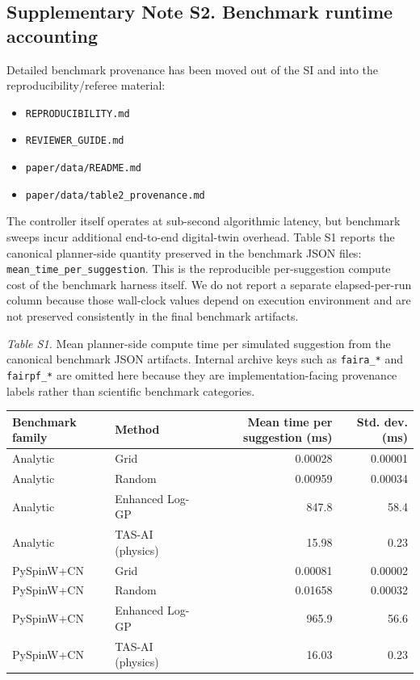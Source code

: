 \documentclass[
]{article}
\providecommand{\tightlist}{%
  \setlength{\itemsep}{0pt}\setlength{\parskip}{0pt}}
\begin{document}
\hypertarget{supplementary-note-s2.-benchmark-runtime-accounting}{%
\subsection{Supplementary Note S2. Benchmark runtime
accounting}\label{supplementary-note-s2.-benchmark-runtime-accounting}}

Detailed benchmark provenance has been moved out of the SI and into the
reproducibility/referee material:

\begin{itemize}
\tightlist
\item
  \texttt{REPRODUCIBILITY.md}
\item
  \texttt{REVIEWER\_GUIDE.md}
\item
  \texttt{paper/data/README.md}
\item
  \texttt{paper/data/table2\_provenance.md}
\end{itemize}

The controller itself operates at sub-second algorithmic latency, but
benchmark sweeps incur additional end-to-end digital-twin overhead.
Table S1 reports the canonical planner-side quantity preserved in the
benchmark JSON files: \texttt{mean\_time\_per\_suggestion}. This is the
reproducible per-suggestion compute cost of the benchmark harness
itself. We do not report a separate elapsed-per-run column because those
wall-clock values depend on execution environment and are not preserved
consistently in the final benchmark artifacts.

\emph{Table S1.} Mean planner-side compute time per simulated suggestion
from the canonical benchmark JSON artifacts. Internal archive keys such
as \texttt{faira\_*} and \texttt{fairpf\_*} are omitted here because
they are implementation-facing provenance labels rather than scientific
benchmark categories.

\begin{longtable}[]{@{}llrr@{}}
\toprule
\textbf{Benchmark family} & \textbf{Method} & \textbf{Mean time per
suggestion (ms)} & \textbf{Std. dev. (ms)}\tabularnewline
\midrule
\endhead
Analytic & Grid & 0.00028 & 0.00001\tabularnewline
Analytic & Random & 0.00959 & 0.00034\tabularnewline
Analytic & Enhanced Log-GP & 847.8 & 58.4\tabularnewline
Analytic & TAS-AI (physics) & 15.98 & 0.23\tabularnewline
PySpinW+CN & Grid & 0.00081 & 0.00002\tabularnewline
PySpinW+CN & Random & 0.01658 & 0.00032\tabularnewline
PySpinW+CN & Enhanced Log-GP & 965.9 & 56.6\tabularnewline
PySpinW+CN & TAS-AI (physics) & 16.03 & 0.23\tabularnewline
\bottomrule
\end{longtable}
\end{document}
